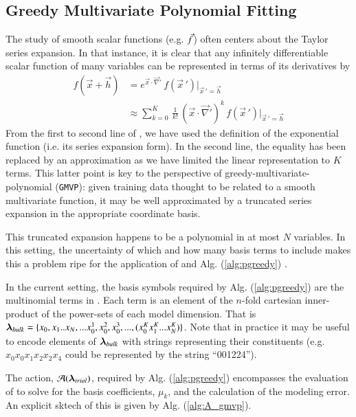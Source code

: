 \documentclass[twocolumn,aps,prd,floatfix,preprintnumbers,a4paper,nofootinbib,
superscriptaddress,10pt]{revtex4-1}
\def\gmvp#1{greedy-multivariate-polynomial#1
  (\texttt{GMVP}#1)\gdef\gmvp{\texttt{GMVP}}}
\begin{document}
\subsection{Greedy Multivariate Polynomial Fitting}
%
The study of smooth scalar functions (e.g. $\vec{f}$) often centers about the Taylor series expansion.
%
In that instance, it is clear that any infinitely differentiable scalar function of many variables can be represented in terms of its derivatives by
%
\begin{align}
  \label{eq:mvt}
  f( \vec{x} + \vec{h} ) &= e^{ \vec{x} \cdot \vec{\nabla}' } \, f(\vec{x}\,') |_{\vec{x}\,'=\vec{h}}
  \\ \nonumber
  &\approx \sum_{k=0}^{K} \, \frac{1}{k!} \, (\vec{x} \cdot \vec{\nabla}')^{k} \, f(\vec{x}\,') |_{\vec{x}\,'=\vec{h}}
\end{align}
%
From the first to second line of , we have used the definition of the exponential function (i.e. its series expansion form).
%
In the second line, the equality has been replaced by an approximation as we have limited the linear representation to $K$ terms.
%
This latter point is key to the perspective of \gmvp{}: given training data thought to be related to a smooth multivariate function, it may be well approximated by a truncated series expansion in the appropriate coordinate basis.
%
\par This truncated expansion happens to be a polynomial in at most $N$ variables.
%
In this setting, the uncertainty of which and how many basis terms to include makes this a problem ripe for the application of  and Alg. (\ref{alg:pgreedy}) .
%
\par In the current setting, the basis symbols required by Alg. (\ref{alg:pgreedy}) are the multinomial terms in .
%
Each term is an element of the $n$-fold cartesian inner-product of the power-sets of each model dimension. That is ${\bm{\lambda}}_{bulk} = \{x_0,x_1 .. x_N, ... x_0^1, x_0^2, x_0^3, ...  , (x_0^K x_1^K ... x_N^K) \}$.
%
Note that in practice it may be useful to encode elements of ${\bm{\lambda}}_{bulk}$ with strings representing their constituents (e.g. $x_0 x_0 x_1 x_2 x_2 x_4$ could be represented by the string ``001224'').
%
\par The action, $\mathcal{A}({\bm{\lambda}}_{trial})$, required by Alg. (\ref{alg:pgreedy}) encompasses the evaluation of  to solve for the basis coefficients, $\mu_k$, and the calculation of the modeling error.
%
An explicit sktech of this is given by Alg. (\ref{alg:A_gmvp}).
%
\hspace{1cm}
\end{document}

